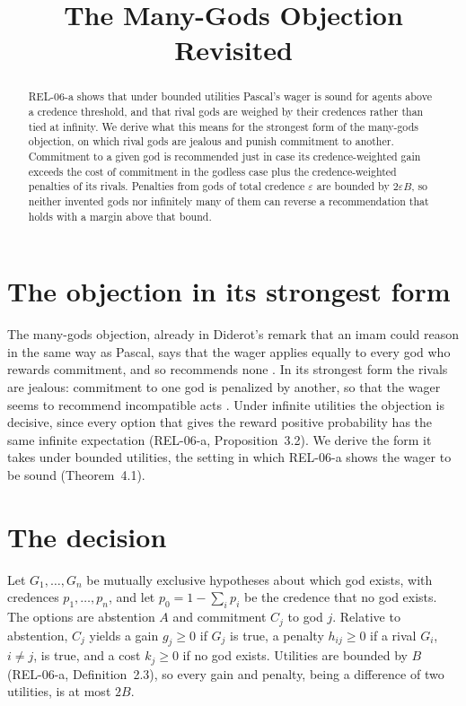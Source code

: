 \documentclass{situationist-preprint}
\title{The Many-Gods Objection Revisited}
\begin{document}
\maketitle

\begin{abstract}
REL-06-a shows that under bounded utilities Pascal's wager is sound for agents above a credence threshold, and that rival gods are weighed by their credences rather than tied at infinity. We derive what this means for the strongest form of the many-gods objection, on which rival gods are jealous and punish commitment to another. Commitment to a given god is recommended just in case its credence-weighted gain exceeds the cost of commitment in the godless case plus the credence-weighted penalties of its rivals. Penalties from gods of total credence $\varepsilon$ are bounded by $2\varepsilon B$, so neither invented gods nor infinitely many of them can reverse a recommendation that holds with a margin above that bound.
\end{abstract}

\section{The objection in its strongest form}

The many-gods objection, already in Diderot's remark that an imam could reason in the same way as Pascal, says that the wager applies equally to every god who rewards commitment, and so recommends none \citep{Diderot1746,Mackie1982}. In its strongest form the rivals are jealous: commitment to one god is penalized by another, so that the wager seems to recommend incompatible acts \citep{Cargile1966}. Under infinite utilities the objection is decisive, since every option that gives the reward positive probability has the same infinite expectation (REL-06-a, Proposition~3.2). We derive the form it takes under bounded utilities, the setting in which REL-06-a shows the wager to be sound (Theorem~4.1).

\section{The decision}

Let $G_1, \dots, G_n$ be mutually exclusive hypotheses about which god exists, with credences $p_1, \dots, p_n$, and let $p_0 = 1 - \sum_i p_i$ be the credence that no god exists. The options are abstention $A$ and commitment $C_j$ to god $j$. Relative to abstention, $C_j$ yields a gain $g_j \geq 0$ if $G_j$ is true, a penalty $h_{ij} \geq 0$ if a rival $G_i$, $i \neq j$, is true, and a cost $k_j \geq 0$ if no god exists. Utilities are bounded by $B$ (REL-06-a, Definition~2.3), so every gain and penalty, being a difference of two utilities, is at most $2B$.
\end{document}
